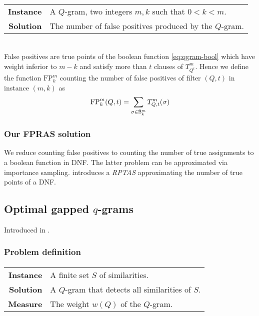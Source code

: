 \paragraph{}
\begin{tabular}{rl}
{\bf Instance}	&	A $Q$-gram, two integers $m,k$ such that $0 < k < m$.\\
{\bf Solution}	&	The number of false positives produced by the $Q$-gram.\\
\end{tabular}
\\

False positives are true points of the boolean function \ref{eq:qgram-bool} which have weight inferior to $m-k$ and satisfy more than $t$ clauses of $T_{Q^t}^{m}$.
Hence we define the function $\text{FP}_{k}^{m}$ counting the number of false positives of filter $(Q,t)$ in instance $(m,k)$ as
\begin{equation}
\text{FP}_{k}^{m}(Q,t) = \sum_{\sigma \in {\bar{\ensuremath{\mathbb {B}}}^{m}_{k}}} T_{Q,t}^{m}(\sigma)
\end{equation}

\subsubsection{Our FPRAS solution}

We reduce counting false positives to counting the number of true assignments to a boolean function in DNF.
The latter problem can be approximated via importance sampling.
\citeauthor{Vazirani01} introduces a \emph{RPTAS} approximating the number of true points of a DNF.


\subsection{Optimal gapped $q$-grams}

Introduced in \citep{Nicolas2005}.

\subsubsection{Problem definition}

\paragraph{}
\begin{tabular}{rl}
{\bf Instance}	&	A finite set $S$ of similarities.\\
{\bf Solution}	&	A $Q$-gram that detects all similarities of $S$.\\
{\bf Measure}	&	The weight $w(Q)$ of the $Q$-gram.\\
\end{tabular}
\\

